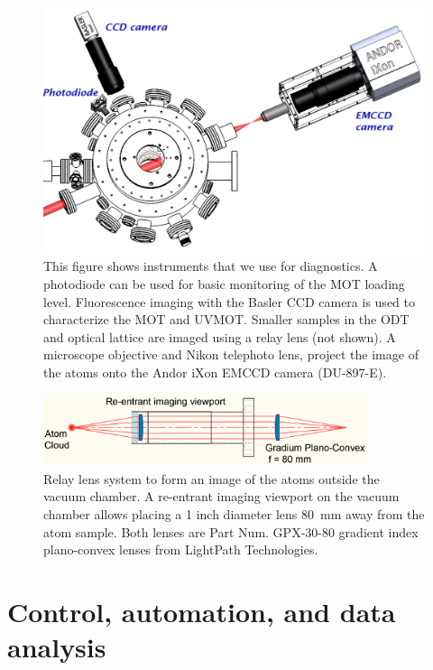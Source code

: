 \begin{figure}
\includegraphics[width=\textwidth]{../masters-figures/imaging/setup.pdf}
\caption[Diagnostics setup]{\small This figure shows instruments that we use
for diagnostics.  A photodiode can be used for basic monitoring of the MOT
loading level.  Fluorescence imaging with the Basler CCD camera is used to
characterize the MOT and UVMOT.   Smaller samples in the ODT and optical
lattice are imaged using a relay lens (not shown). A microscope objective and
Nikon telephoto lens, project the image of the atoms onto the Andor iXon EMCCD
camera (DU-897-E).}  
\label{fig:diagnostics} 
\end{figure}
 
\begin{figure} \centering
\includegraphics[width=0.85\textwidth]{../masters-figures/imaging/relay.pdf}
\caption[Relay lens system]{\small  Relay lens system to form an image of the
atoms outside the vacuum chamber. A re-entrant imaging viewport on the vacuum
chamber allows placing a 1 inch diameter lens 80~mm away from the atom sample.
Both lenses are Part Num. GPX-30-80 gradient index plano-convex lenses from
LightPath Technologies.  }
\label{fig:relaylens} \end{figure} 



\section{Control, automation, and data analysis}

